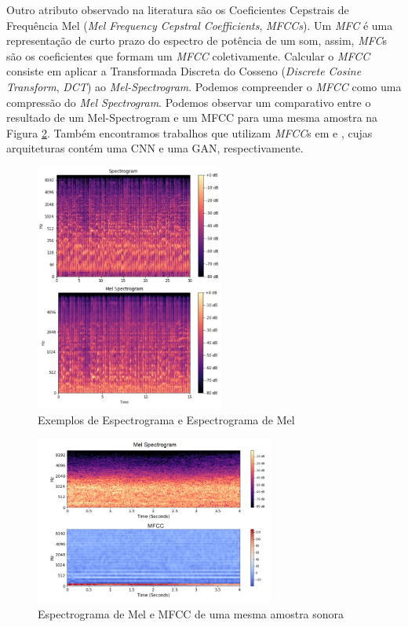 Outro atributo observado na literatura são os Coeficientes Cepstrais de Frequência Mel (\textit{Mel Frequency Cepstral Coefficients}, \textit{MFCCs}). Um \textit{MFC} é uma representação de curto prazo do espectro de potência de um som, assim, \textit{MFC}s são os coeficientes que formam um \textit{MFCC} coletivamente. Calcular o \textit{MFCC} consiste em aplicar a Transformada Discreta do Cosseno (\textit{Discrete Cosine Transform}, \textit{DCT}) ao \textit{Mel-Spectrogram}. Podemos compreender o \textit{MFCC} como uma compressão \cite{62} do \textit{Mel Spectrogram}. Podemos observar um comparativo entre o resultado de um Mel-Spectrogram e um MFCC para uma mesma amostra na Figura \ref{fig:melspecvsmfcc}. Também encontramos trabalhos que utilizam \textit{MFCC}s em \cite{32.79} e \cite{32.89}, cujas arquiteturas contém uma CNN e uma GAN, respectivamente.

\clearpage

\begin{figure}[!h]
\centering
\includegraphics[width=0.55\textwidth]{imagens/espectrograma-vs-mel-espectrograma.png}
\caption{\label{fig:specvsmelespectrograma}Exemplos de Espectrograma e Espectrograma de Mel}
\end{figure}

\begin{figure}[!h]
\centering
\includegraphics[width=0.7\textwidth]{imagens/melspec-vs-mfcc.PNG}
\caption{\label{fig:melspecvsmfcc}Espectrograma de Mel e MFCC de uma mesma amostra sonora}

\author{Fonte: Imagem adaptada de \cite{62}}
\end{figure}

